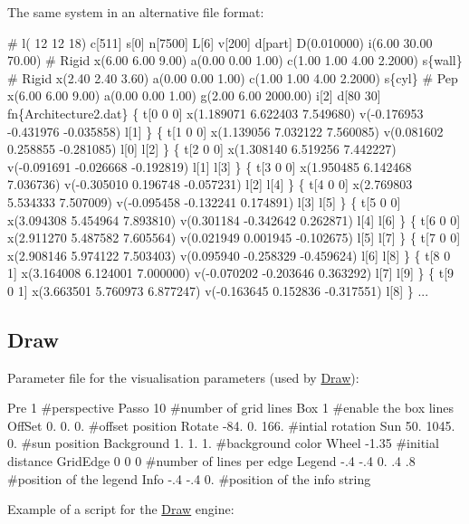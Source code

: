  The same system in an alternative file format\+: 
\begin{DoxyCode}
\textcolor{preprocessor}{# l( 12 12 18) c[511] s[0] n[7500] L[6] v[200] d[part] D(0.010000) i(6.00 30.00 70.00) }
\textcolor{preprocessor}{# Rigid x(6.00 6.00 9.00) a(0.00 0.00 1.00) c(1.00 1.00 4.00 2.2000) s\{wall\}}
\textcolor{preprocessor}{# Rigid x(2.40 2.40 3.60) a(0.00 0.00 1.00) c(1.00 1.00 4.00 2.2000) s\{cyl\}}
\textcolor{preprocessor}{# Pep x(6.00 6.00 9.00) a(0.00 0.00 1.00) g(2.00 6.00 2000.00) i[2] d[80 30] fn\{Architecture2.dat\}}
\{ t[0 0 0] x(1.189071 6.622403 7.549680) v(-0.176953 -0.431976 -0.035858) l[1] \}
\{ t[1 0 0] x(1.139056 7.032122 7.560085) v(0.081602 0.258855 -0.281085) l[0] l[2] \}
\{ t[2 0 0] x(1.308140 6.519256 7.442227) v(-0.091691 -0.026668 -0.192819) l[1] l[3] \}
\{ t[3 0 0] x(1.950485 6.142468 7.036736) v(-0.305010 0.196748 -0.057231) l[2] l[4] \}
\{ t[4 0 0] x(2.769803 5.534333 7.507009) v(-0.095458 -0.132241 0.174891) l[3] l[5] \}
\{ t[5 0 0] x(3.094308 5.454964 7.893810) v(0.301184 -0.342642 0.262871) l[4] l[6] \}
\{ t[6 0 0] x(2.911270 5.487582 7.605564) v(0.021949 0.001945 -0.102675) l[5] l[7] \}
\{ t[7 0 0] x(2.908146 5.974122 7.503403) v(0.095940 -0.258329 -0.459624) l[6] l[8] \}
\{ t[8 0 1] x(3.164008 6.124001 7.000000) v(-0.070202 -0.203646 0.363292) l[7] l[9] \}
\{ t[9 0 1] x(3.663501 5.760973 6.877247) v(-0.163645 0.152836 -0.317551) l[8] \}
...
\end{DoxyCode}
\hypertarget{param_page_Draw_section}{}\subsection{Draw}\label{param_page_Draw_section}
Parameter file for the visualisation parameters (used by \hyperlink{classDraw}{Draw})\+: 
\begin{DoxyCode}
Pre           1                    #perspective
Passo         10                   #number of grid lines
Box           1                    #enable the box lines
OffSet        0. 0. 0.             #offset position
Rotate        -84. 0. 166.         #intial rotation
Sun           50. 1045. 0.         #sun position
Background    1. 1. 1.             #background color
Wheel         -1.35                #initial distance
GridEdge      0 0 0                #number of lines per edge
Legend        -.4 -.4 0. .4 .8     #position of the legend
Info          -.4 -.4 0.           #position of the info \textcolor{keywordtype}{string}
\end{DoxyCode}
 Example of a script for the \hyperlink{classDraw}{Draw} engine\+: 
